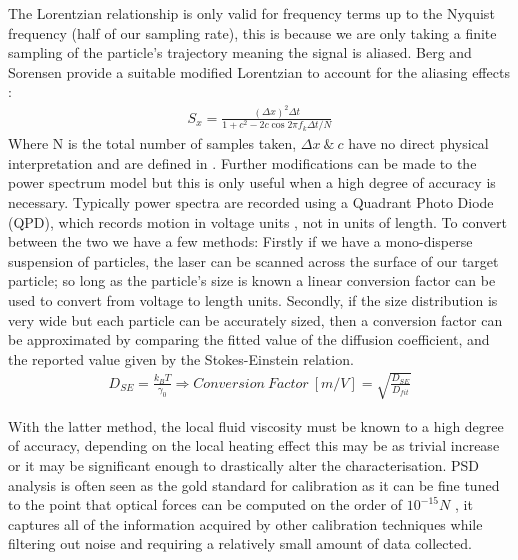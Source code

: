 The Lorentzian relationship is only valid for frequency terms up to 
the Nyquist frequency (half of our sampling rate), this is because we 
are only taking a finite sampling of the particle's trajectory meaning 
the signal is aliased. Berg and Sorensen provide a suitable modified 
Lorentzian to account for the aliasing effects \cite{BergSoerensen2004}:
\begin{align}
	\label{eq:alaised_lorentzian}
	S_x = \frac{(\Delta x)^2\Delta t}{1+c^2-2c\cos{2\pi f_k\Delta t/N}}
\end{align}
Where N is the total number of samples taken, $\Delta x \ \& \ c$ 
have no direct physical interpretation and are defined in 
\cite{BergSoerensen2004}. Further modifications can be made to the 
power spectrum model but this is only useful when a high degree of 
accuracy is necessary. Typically power spectra are recorded using 
a Quadrant Photo Diode (QPD), which records motion in voltage units
, not in units of length. To convert between the two we have a few 
methods: Firstly if we have a mono-disperse suspension of particles, 
the laser can be scanned across the surface of our target particle; 
so long as the particle's size is known a linear conversion factor 
can be used to convert from voltage to length units. Secondly, if 
the size distribution is very wide but each particle can be accurately 
sized, then a conversion factor can be approximated by comparing the 
fitted value of the diffusion coefficient, and the reported value 
given by the Stokes-Einstein relation.
\begin{align}
	\label{eq:correction_factor}
	D_{SE} = \frac{k_BT}{\gamma_0} \Rightarrow Conversion\ Factor \ [m/V]= \sqrt{\frac{D_{SE}}{D_{fit}}}
\end{align}

With the latter method, the local fluid viscosity must be known to a 
high degree of accuracy, depending on the local heating effect this 
may be as trivial increase or it may be significant enough to drastically 
alter the characterisation. PSD analysis is often seen as the gold 
standard for calibration as it can be fine tuned to the point that 
optical forces can be computed on the order of $10^{-15} N$ 
\cite{BergSoerensen2004}, it captures all of the information acquired 
by other calibration techniques while filtering out noise and requiring 
a relatively small amount of data collected. 

